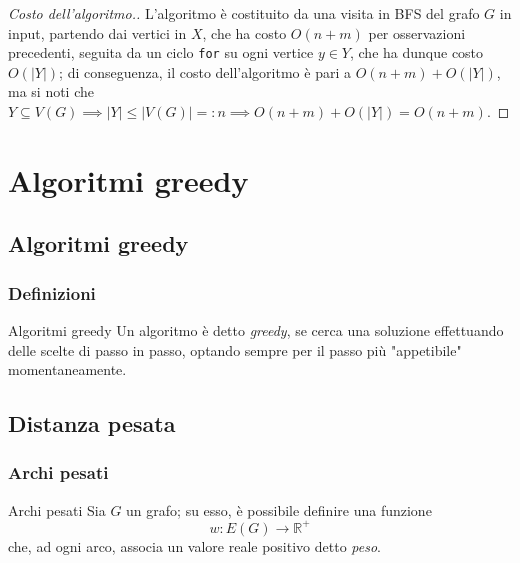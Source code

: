 \documentclass[a4paper, 12pt]{report}
\begin{document}
    \begin{proof}[Costo dell'algoritmo.]
        L'algoritmo è costituito da una visita in BFS del grafo $G$ in input, partendo dai vertici in $X$, che ha costo $O(n + m)$ per osservazioni precedenti, seguita da un ciclo \texttt{for} su ogni vertice $y \in Y$, che ha dunque costo $O(|Y|)$; di conseguenza, il costo dell'algoritmo è pari a $O(n + m) + O(|Y|)$, ma si noti che $Y \subseteq V(G) \implies |Y| \le |V(G)| =: n \implies O(n + m) + O(|Y|) = O(n + m)$.
    \end{proof}

    \chapter{Algoritmi greedy}

    \section{Algoritmi greedy}

    \subsection{Definizioni}

    \begin{frameddefn}{Algoritmi greedy}
        Un algoritmo è detto \textit{greedy}, se cerca una soluzione effettuando delle scelte di passo in passo, optando sempre per il passo più "appetibile" momentaneamente.
    \end{frameddefn}

    \section{Distanza pesata}

    \subsection{Archi pesati}

    \begin{frameddefn}{Archi pesati}
        Sia $G$ un grafo; su esso, è possibile definire una funzione $$w: E(G) \rightarrow \mathbb{R}^+$$ che, ad ogni arco, associa un valore reale positivo detto \textit{peso}.
    \end{frameddefn}
\end{document}
